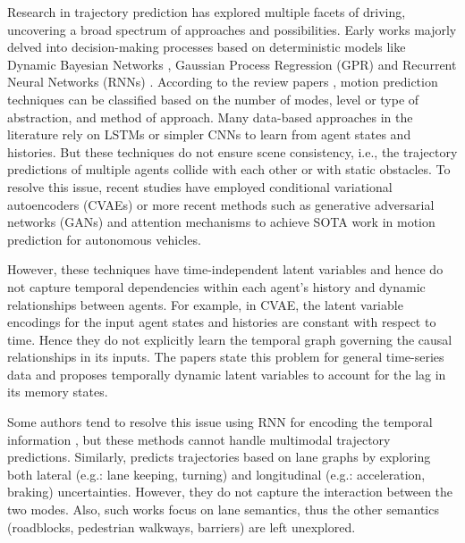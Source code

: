 \documentclass[letterpaper, 10 pt, conference]{ieeeconf}  %
\begin{document}
Research in trajectory prediction has explored multiple facets of driving, uncovering a broad spectrum of approaches and possibilities.  Early works majorly delved into decision-making processes based on deterministic models like Dynamic Bayesian Networks \cite{Lefvre2014ASO}, Gaussian
 Process Regression (GPR) \cite{4359316} and Recurrent Neural Networks (RNNs) \cite{article} \cite{8460504} \cite{jia2022towards}. According to the review papers \cite{Leon_2021} \cite{Rudenko_2020}, motion prediction techniques can be classified based on the number of modes, level or type of abstraction, and method of approach. 
Many data-based approaches in the literature rely on LSTMs
or simpler CNNs
\cite{nikhil2018convolutional} to learn from agent states and histories. But these techniques do not ensure scene consistency, i.e., the trajectory predictions of multiple agents collide with each other or with static obstacles. 
To resolve this issue, recent studies have employed conditional variational autoencoders (CVAEs) or more recent methods
such as generative adversarial networks (GANs) and attention mechanisms to achieve SOTA work in motion prediction for autonomous vehicles. 

However, these techniques have time-independent latent variables and hence do not capture temporal dependencies within each agent's history and dynamic relationships between agents. For example, in CVAE, the latent variable encodings for the input agent states and histories are constant with respect to time. Hence they do not explicitly learn the temporal graph governing the causal relationships in its inputs. The papers \cite{7796911} \cite{girgis2022latent} state this problem for general time-series data and proposes temporally dynamic latent variables to account for the lag in its memory states.  

Some authors tend to resolve this issue using RNN for encoding the temporal information \cite{jain2016structuralrnn} \cite{jia2022towards}, but these methods cannot handle multimodal trajectory predictions. Similarly, \cite{lanegraph} predicts trajectories based on lane graphs by exploring both lateral (e.g.: lane keeping, turning) and longitudinal (e.g.: acceleration, braking) uncertainties. However, they do not capture the interaction between the two modes. Also, such works \cite{laformer} focus on lane semantics, thus the other semantics (roadblocks, pedestrian walkways, barriers) are left unexplored.
\end{document}
